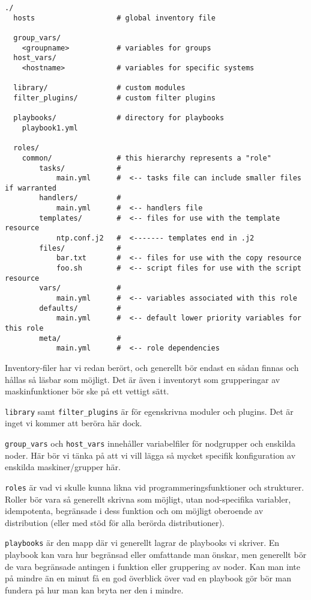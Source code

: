 \begin{verbatim}
./
  hosts                   # global inventory file
  
  group_vars/
    <groupname>           # variables for groups
  host_vars/
    <hostname>            # variables for specific systems
  
  library/                # custom modules
  filter_plugins/         # custom filter plugins
  
  playbooks/              # directory for playbooks
    playbook1.yml

  roles/                  
    common/               # this hierarchy represents a "role"
        tasks/            #
            main.yml      #  <-- tasks file can include smaller files if warranted
        handlers/         #
            main.yml      #  <-- handlers file
        templates/        #  <-- files for use with the template resource
            ntp.conf.j2   #  <------- templates end in .j2
        files/            #
            bar.txt       #  <-- files for use with the copy resource
            foo.sh        #  <-- script files for use with the script resource
        vars/             #
            main.yml      #  <-- variables associated with this role
        defaults/         #
            main.yml      #  <-- default lower priority variables for this role
        meta/             #
            main.yml      #  <-- role dependencies

\end{verbatim}

Inventory-filer har vi redan berört, och generellt bör endast en sådan finnas och hållas så läsbar som möjligt.
Det är även i inventoryt som grupperingar av maskinfunktioner bör ske på ett vettigt sätt.

\texttt{library} samt \texttt{filter\_plugins} är för egenskrivna moduler och plugins. 
Det är inget vi kommer att beröra här dock.

\texttt{group\_vars} och \texttt{host\_vars} innehåller variabelfiler för nodgrupper och enskilda noder.
Här bör vi tänka på att vi vill lägga så mycket specifik konfiguration av enskilda maskiner/grupper här. 

\texttt{roles} är vad vi skulle kunna likna vid programmeringsfunktioner och strukturer. Roller bör vara så
generellt skrivna som möjligt, utan nod-specifika variabler, idempotenta, begränsade i dess funktion och 
om möjligt oberoende av distribution (eller med stöd för alla berörda distributioner).

\texttt{playbooks} är den mapp där vi generellt lagrar de playbooks vi skriver. En playbook kan vara hur begränsad
eller omfattande man önskar, men generellt bör de vara begränsade antingen i funktion eller gruppering av noder.
Kan man inte på mindre än en minut få en god överblick över vad en playbook gör bör man fundera på hur man kan
bryta ner den i mindre.
